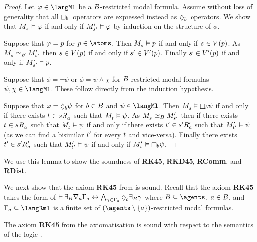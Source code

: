 \begin{proof}
Let $\phi \in \langMl$ be a $B$-restricted modal formula.
Assume without loss of generality that all $\necessaryB$~operators are expressed instead as $\possibleB$~operators.
We show that $\kPModel{\kStateS} \entails \phi$ if and only if ${M^{\prime}_{{s}^{\prime}}} \vDash \varphi$ by induction on the structure of $\phi$.

Suppose that $\varphi = p$ for $\atomP \in \atoms$.
Then $\kPModel{\kStateS} \entails \atomP$ if and only if $\kStateS \in \kValuation(\atomP)$.
As $\kPModel{\kStateS} \bisimilar[\agentsB] \kPModelP{\kStateSP}$ then $\kStateS \in \kValuation(\atomP)$ if and only if ${s}^{\prime} \in {V^{\prime}}(p)$.
Finally ${s}^{\prime} \in {V^{\prime}}(p)$ if and only if ${M^{\prime}_{{s}^{\prime}}} \vDash p$.

Suppose that $\phi = \lnot \psi$ or $\phi = \psi \land \chi$ for $B$-restricted modal formulas $\psi, \chi \in \langMl$.
These follow directly from the induction hypothesis.

Suppose that $\phi = \possible[\agentB] \psi$ for $b \in B$ and $\psi \in \langMl$.
Then $\kPModel{\kStateS} \entails \necessary[\agentB] \psi$ if and only if there exists $\kStateT \in \kSuccessorsA{\kStateS}$ such that $\kPModel{\kStateT} \entails \psi$.
As $\kPModel{\kStateS} \bisimilar[\agentsB] \kPModelP{\kStateSP}$ then if there exists $\kStateT \in \kSuccessorsA{\kStateS}$ such that $\kPModel{\kStateT} \entails \psi$ if and only if there exists ${t}^{\prime} \in {{s}^{\prime}} {R^{\prime}_{a}}$ such that ${M^{\prime}_{{t}^{\prime}}} \vDash \psi$ (as we can find a bisimilar ${t}^{\prime}$ for every $\kStateT$ and vice-versa).
Finally there exists ${t}^{\prime} \in {{s}^{\prime}} {R^{\prime}_{a}}$ such that ${M^{\prime}_{{t}^{\prime}}} \vDash \psi$ if and only if $\kPModelP{\kStateS} \entails \necessary[\agentB] \psi$.
\end{proof}

We use this lemma to show the soundness of {\bf RK45}, {\bf RKD45}, {\bf RComm}, and {\bf RDist}.

We next show that the axiom {\bf RK45} from \axiomRmlKFF{} is sound.
Recall that the axiom {\bf RK45} takes the form of $\proves \somerefsBs \coversA \Gamma_\agentA \iff \bigwedge_{\gamma \in \Gamma_\agentA} \possibleA \somerefsBs \gamma$ where $\agentsB \subseteq \agents$, $a \in B$, and $\Gamma_\agentA \subseteq \langRml$ is a finite set of $(\agents \setminus \{\agentA\})$-restricted modal formulas.

\begin{lemma}\label{rml-kff-rkff}
The axiom {\bf RK45} from the axiomatisation \axiomRmlKFF{} is sound with respect to the semantics of the logic \logicRmlKFF{}.
\end{lemma}

